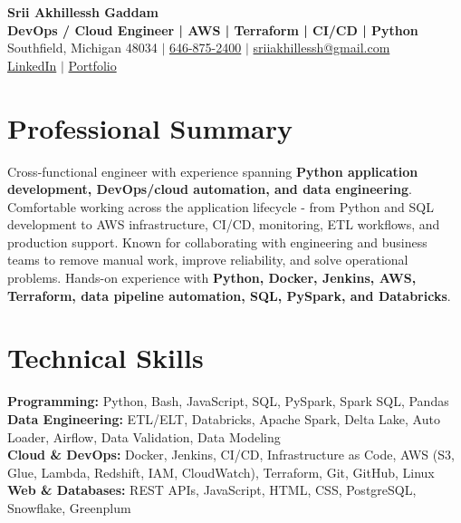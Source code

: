 \documentclass[letterpaper,10pt]{article}
\begin{document}
\fontsize{9.35pt}{10.45pt}\selectfont

\begin{center}
    {\LARGE \textbf{Srii Akhillessh Gaddam}} \\[-1pt]
    \textbf{DevOps / Cloud Engineer | AWS | Terraform | CI/CD | Python} \\[2pt]
    Southfield, Michigan 48034 $|$
    \href{tel:6468752400}{646-875-2400} $|$
    \href{mailto:sriiakhillessh@gmail.com}{sriiakhillessh@gmail.com} \\[1pt]
    \href{https://www.linkedin.com/in/srii-akhiilessh-gaddam-b48668191/}{LinkedIn} $|$
    \href{https://sriiakhillesshg.github.io/portfolio/}{Portfolio}
\end{center}
\vspace{-8pt}

\section{Professional Summary}
\small{Cross-functional engineer with experience spanning \textbf{Python application development, DevOps/cloud automation, and data engineering}. Comfortable working across the application lifecycle - from Python and SQL development to AWS infrastructure, CI/CD, monitoring, ETL workflows, and production support. Known for collaborating with engineering and business teams to remove manual work, improve reliability, and solve operational problems. Hands-on experience with \textbf{Python, Docker, Jenkins, AWS, Terraform, data pipeline automation, SQL, PySpark, and Databricks}.}

\section{Technical Skills}
\small{
\textbf{Programming:} Python, Bash, JavaScript, SQL, PySpark, Spark SQL, Pandas \\
\textbf{Data Engineering:} ETL/ELT, Databricks, Apache Spark, Delta Lake, Auto Loader, Airflow, Data Validation, Data Modeling \\
\textbf{Cloud \& DevOps:} Docker, Jenkins, CI/CD, Infrastructure as Code, AWS (S3, Glue, Lambda, Redshift, IAM, CloudWatch), Terraform, Git, GitHub, Linux \\
\textbf{Web \& Databases:} REST APIs, JavaScript, HTML, CSS, PostgreSQL, Snowflake, Greenplum
}
\end{document}

